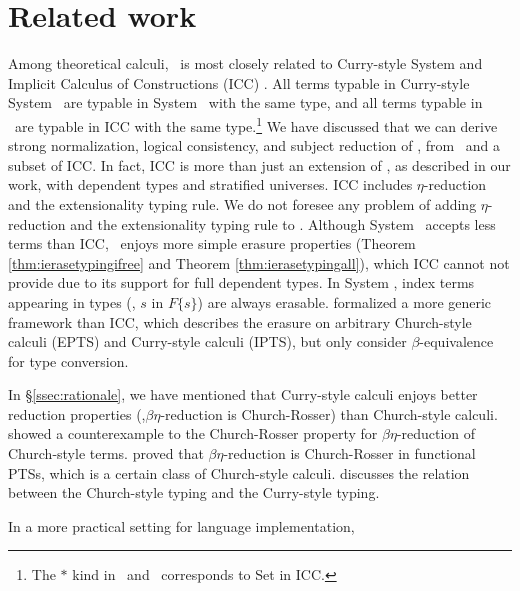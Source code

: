 \section{Related work}
\label{sec:relwork}
Among theoretical calculi, \Fi\ is most closely related to
Curry-style System \Fw \cite{AbeMatUus03,AbeMatUus05,GHR93}
and Implicit Calculus of Constructions (ICC) \cite{Miquel01}.
All terms typable in Curry-style System \Fw\ are typable in System \Fi\ 
with the same type, and all terms typable in \Fi\ are typable in ICC
with the same type.\footnote{The $*$ kind in \Fw\ and \Fi\ corresponds
	to \textsf{Set} in ICC.}
We have discussed that we can derive strong normalization, logical consistency,
and subject reduction of \Fi, from \Fw\ and a subset of ICC.
In fact, ICC is more than just an extension of \Fi, as described in our work,
with dependent types and stratified universes. ICC includes $\eta$-reduction
and the extensionality typing rule. We do not foresee any problem of adding
$\eta$-reduction and the extensionality typing rule to \Fi. Although
System \Fi\ accepts less terms than ICC, \Fi\ enjoys more simple
erasure properties (Theorem \ref{thm:ierasetypingifree} and
Theorem \ref{thm:ierasetypingall}), which ICC cannot not provide
due to its support for full dependent types. In System \Fi, index terms
appearing in types (\eg, $s$ in $F\{s\}$) are always erasable.
\citet{LingerS08} formalized a more generic framework than ICC, which describes
the erasure on arbitrary Church-style calculi (EPTS) and Curry-style calculi
(IPTS), but only consider $\beta$-equivalence for type conversion.

In \S\ref{ssec:rationale}, we have mentioned that Curry-style calculi enjoys
better reduction properties (\eg,$\beta\eta$-reduction is Church-Rosser)
than Church-style calculi. \citet{Nederpelt73} showed a counterexample to
the Church-Rosser property for $\beta\eta$-reduction of Church-style terms.
\citet{Geuvers92} proved that $\beta\eta$-reduction is Church-Rosser
in functional PTSs, which is a certain class of Church-style calculi.
\citet{Seldin08} discusses the relation between the Church-style typing
and the Curry-style typing.

In a more practical setting for language implementation,

